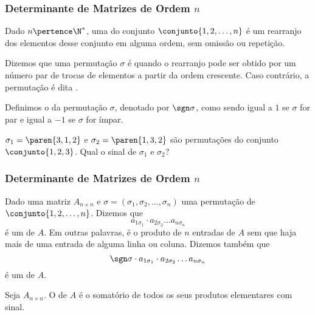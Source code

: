 
\begin{frame}
    \frametitle{Determinante de Matrizes de Ordem $n$}

    
    \begin{definicao}[Permutação]
        Dado $n \pertence \N^{\ast}$, uma  do conjunto $\conjunto{1, 2, \dots , n}$ é um rearranjo dos elementos desse conjunto  em alguma ordem, sem omissão ou repetição. 
        
        Dizemos que uma permutação $\sigma$ é  quando o rearranjo pode ser obtido por um número par de trocas de elementos a partir da ordem crescente. Caso contrário, a permutação é dita .

        Definimos o  da permutação $\sigma$, denotado por $\sgn  \sigma$, como sendo igual a $1$ se  $\sigma$ for par e igual a $-1$ se $\sigma$ for ímpar.
    \end{definicao}\pause

 
    
    \begin{exemplo}
        $\sigma_1 = \paren{3, 1, 2}$ e $\sigma_2 = \paren{1,3,2}$ são permutações do conjunto $\conjunto{1, 2, 3}$. Qual o sinal de $\sigma_1$ e $\sigma_2$?
    \end{exemplo}
\end{frame}


\begin{frame}
    \frametitle{Determinante de Matrizes de Ordem $n$}

    
    \begin{definicao}
        Dado uma matriz $A_{n \times n}$ e $\sigma = (\sigma_1, \sigma_2, \dots , \sigma_n)$ uma permutação de $\conjunto{1, 2, \dots , n}$. Dizemos que $$a_{1\sigma_1} \cdot a_{2\sigma_2} \dots  a_{n\sigma_n}$$ é um  de $A$. Em outras palavras, é o produto de $n$ entradas de $A$ sem que haja mais de uma entrada de alguma linha ou coluna.
        Dizemos também que $$\sgn \sigma \cdot a_{1\sigma_1}\cdot a_{2\sigma_2} \dots a_{n\sigma_n}$$ é um  de $A$.
    \end{definicao}\pause

 
    
    \begin{definicao}[Determinante]
        Seja $A_{n \times n}$. O  de $A$ é o somatório de todos os seus produtos elementares com sinal.
    \end{definicao}
\end{frame}

